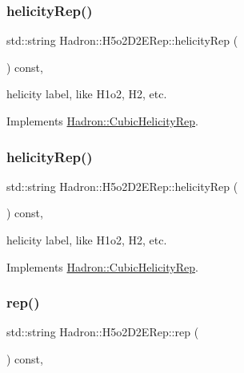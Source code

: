 \subsubsection{\texorpdfstring{helicityRep()}{helicityRep()}\hspace{0.1cm}{\footnotesize\ttfamily [2/3]}}
{\footnotesize\ttfamily std\+::string Hadron\+::\+H5o2\+D2\+E\+Rep\+::helicity\+Rep (\begin{DoxyParamCaption}{ }\end{DoxyParamCaption}) const\hspace{0.3cm}{\ttfamily [inline]}, {\ttfamily [virtual]}}

helicity label, like H1o2, H2, etc. 

Implements \mbox{\hyperlink{structHadron_1_1CubicHelicityRep_af1096946b7470edf0a55451cc662f231}{Hadron\+::\+Cubic\+Helicity\+Rep}}.

\mbox{\label{structHadron_1_1H5o2D2ERep_a88ae729517bb24fb9254ad77081633af}} 
\subsubsection{\texorpdfstring{helicityRep()}{helicityRep()}\hspace{0.1cm}{\footnotesize\ttfamily [3/3]}}
{\footnotesize\ttfamily std\+::string Hadron\+::\+H5o2\+D2\+E\+Rep\+::helicity\+Rep (\begin{DoxyParamCaption}{ }\end{DoxyParamCaption}) const\hspace{0.3cm}{\ttfamily [inline]}, {\ttfamily [virtual]}}

helicity label, like H1o2, H2, etc. 

Implements \mbox{\hyperlink{structHadron_1_1CubicHelicityRep_af1096946b7470edf0a55451cc662f231}{Hadron\+::\+Cubic\+Helicity\+Rep}}.

\mbox{\label{structHadron_1_1H5o2D2ERep_a114f378ebe8c306a6530f530da8ac8d1}} 
\subsubsection{\texorpdfstring{rep()}{rep()}\hspace{0.1cm}{\footnotesize\ttfamily [1/5]}}
{\footnotesize\ttfamily std\+::string Hadron\+::\+H5o2\+D2\+E\+Rep\+::rep (\begin{DoxyParamCaption}{ }\end{DoxyParamCaption}) const\hspace{0.3cm}{\ttfamily [inline]}, {\ttfamily [virtual]}}



